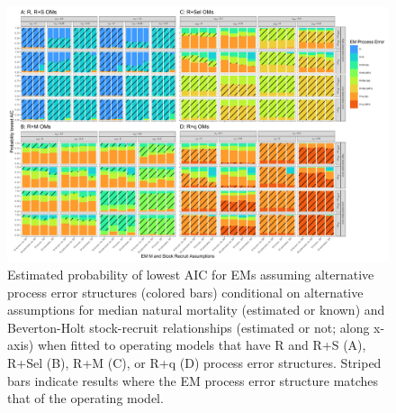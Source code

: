 \documentclass[
  12pt,
]{article}
\begin{document}
\begin{landscape}
\begin{figure}
\begin{center}
\includegraphics{pe_aic_plots}
\end{center}
\caption{Estimated probability of lowest AIC for EMs assuming alternative process error structures (colored bars) conditional on alternative assumptions for median natural mortality (estimated or known) and Beverton-Holt stock-recruit relationships (estimated or not; along x-axis) when fitted to operating models that have R and R+S (A), R+Sel (B), R+M (C), or R+q (D) process error structures. Striped bars indicate results where the EM process error structure matches that of the operating model.}\label{pe_aic}
\end{figure}
\end{landscape}

\clearpage
\end{document}
